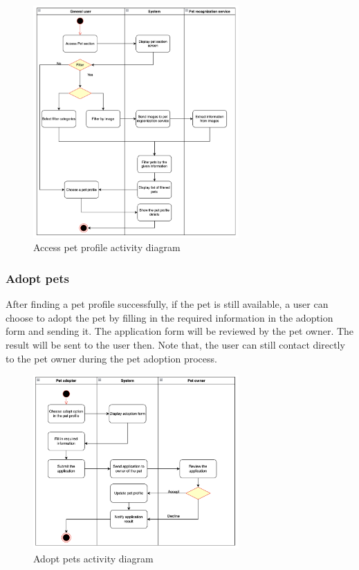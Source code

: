 \begin{figure}[H]
  \centering
  \includegraphics[width=0.7\textwidth]{Figures/access_pet.png}
  \caption{Access pet profile activity diagram}
  \label{fig:access-pet}
\end{figure}

\subsubsection{Adopt pets}

After finding a pet profile successfully, if the pet is still available, a user can choose to adopt the pet by filling in the required information in the adoption form and sending it. The application form will be reviewed by the pet owner. The result will be sent to the user then. Note that, the user can still contact directly to the pet owner during the pet adoption process.

\begin{figure}[H]
  \centering
  \includegraphics[width=0.7\textwidth]{Figures/adopt_pet.png}
  \caption{Adopt pets activity diagram}
  \label{fig:adopt-pet}
\end{figure}

